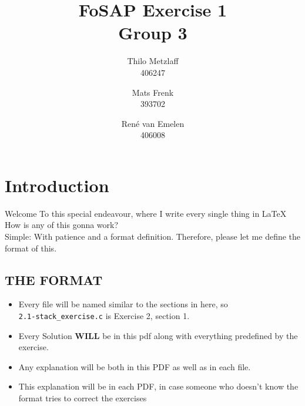 \documentclass[a4paper, 11pt]{article}
\author{Thilo Metzlaff\\406247 \and Mats Frenk\\393702\and René van Emelen\\406008}
\title{FoSAP Exercise 1 \\ \large Group 3}
\begin{document}
    \maketitle
    \newpage

    \tableofcontents
    \newpage

    \section*{Introduction}
    Welcome To this special endeavour, where I write every single thing in \LaTeX{}
    How is any of this gonna work?\\
    Simple: With patience and a format definition. Therefore, please let me define the format of this.

    \subsection*{THE FORMAT}
    \begin{itemize}
        \item Every file will be named similar to the sections in here, so\\
              \texttt{2.1-stack\_exercise.c} is Exercise 2, section 1.
        \item Every Solution \textbf{WILL} be in this pdf along with everything predefined by the exercise.
        \item Any explanation will be both in this PDF as well as in each file.
        \item This explanation will be in each PDF, in case someone who doesn't
              know the format tries to correct the exercises
    \end{itemize}
    \newpage
\end{document}
